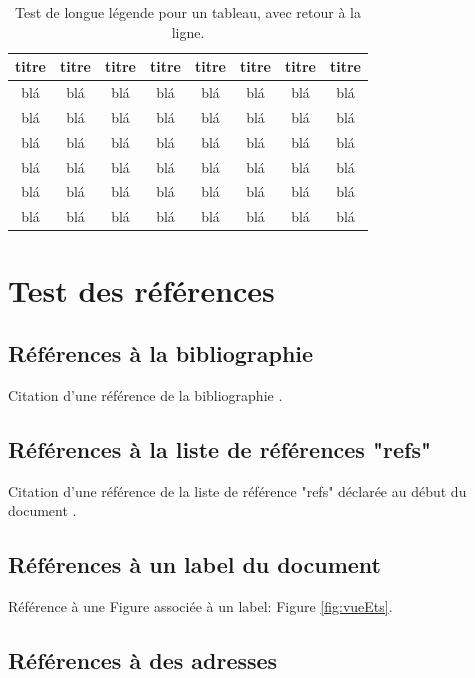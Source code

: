 \documentclass[a4paper, oneside, 12pt, memoireMaitrise, francais, creativecommons, hyperref]{memoESPA}
\begin{document}
\begin{table}
    \parbox{0.65\textwidth}{\caption{Test de longue légende pour un tableau, avec retour à la ligne.}} %
    \begin{tabular}{|c|c|c|c|c|c|c|c|}
	\hline
		      {\bf titre} & {\bf titre} & {\bf titre} & {\bf titre} & {\bf titre} & {\bf titre} & {\bf titre} & {\bf titre} \\
	  \hline
			blá & blá & blá & blá & blá & blá & blá & blá \\
	  \hline
			blá & blá & blá & blá & blá & blá & blá & blá \\
	  \hline
			blá & blá & blá & blá & blá & blá & blá & blá \\
	  \hline
			blá & blá & blá & blá & blá & blá & blá & blá \\
	  \hline
			blá & blá & blá & blá & blá & blá & blá & blá \\
	  \hline
			blá & blá & blá & blá & blá & blá & blá & blá \\
	  \hline
    \end{tabular}
\end{table}


\section{Test des références}

\subsection{Références à la bibliographie}

Citation d'une référence de la bibliographie \citep{BookExample}.

\subsection{Références à la liste de références "refs"}

Citation d'une référence de la liste de référence "refs" déclarée au début du document .

\subsection{Références à un label du document}

Référence à une Figure associée à un label: Figure \ref{fig:vueEts}.

\subsection{Références à des adresses}
\end{document}
